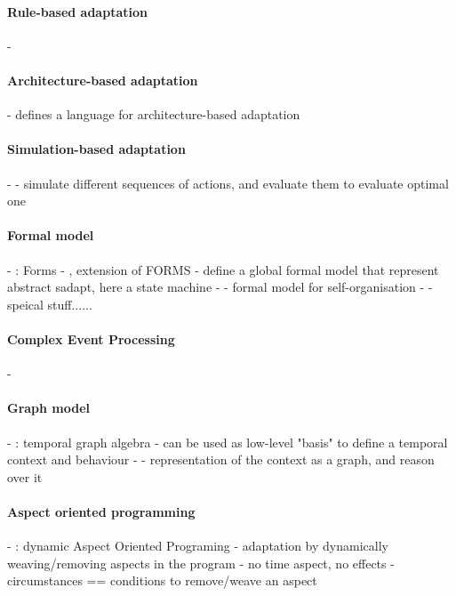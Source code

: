 \paragraph{Rule-based adaptation}
- \cite{DBLP:conf/icse/ArcainiRS15, DBLP:conf/icse/TaharaOH17, DBLP:conf/eurosys/GraceHPBCT08}

\paragraph{Architecture-based adaptation}
- \cite{DBLP:journals/jss/ChengG12} defines a language for architecture-based adaptation

\paragraph{Simulation-based adaptation}
- \cite{DBLP:conf/smartgridsec/0001FKNT14}
	- simulate different sequences of actions, and evaluate them to evaluate optimal one

\paragraph{Formal model}
- \cite{DBLP:journals/taas/WeynsMA12}: Forms
- \cite{DBLP:conf/icse/IftikharW14a}, extension of FORMS
	- define a global formal model that represent abstract \gls{sadapt}, here a state machine
- \cite{DBLP:journals/taas/WeynsHH10}
	- formal model for self-organisation
- \cite{DBLP:conf/icse/BartelsK11}
	- speical stuff......

\paragraph{Complex Event Processing}
- \cite{DBLP:conf/rr/AnicicFRSSS10}

\paragraph{Graph model}
- \cite{DBLP:conf/dbpl/MoffittS17}: temporal graph algebra
	- can be used as low-level "basis" to define a temporal context and behaviour
- \cite{DBLP:journals/tse/KramerM90}
	- representation of the context as a graph, and reason over it
	
\paragraph{Aspect oriented programming}
- \cite{DBLP:journals/taosd/GreenwoodB06, DBLP:conf/soco/DavidL06, DBLP:conf/icws/CharfiDM09, DBLP:journals/scp/ParraBCD11, DBLP:conf/ewsa/FalcarinA04, DBLP:conf/gpce/PintoFT03}: dynamic Aspect Oriented Programing
	- adaptation by dynamically weaving/removing aspects in the program
	- no time aspect, no effects
	- circumstances == conditions to remove/weave an aspect

